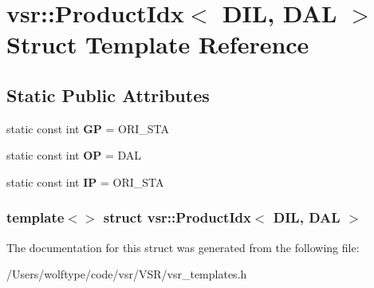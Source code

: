 \hypertarget{structvsr_1_1_product_idx_3_01_d_i_l_00_01_d_a_l_01_4}{\section{vsr\-:\-:Product\-Idx$<$ D\-I\-L, D\-A\-L $>$ Struct Template Reference}
\label{structvsr_1_1_product_idx_3_01_d_i_l_00_01_d_a_l_01_4}
}
\subsection*{Static Public Attributes}
\begin{DoxyCompactItemize}
\item 
\hypertarget{structvsr_1_1_product_idx_3_01_d_i_l_00_01_d_a_l_01_4_aad49c5754260022e11b15c71ac52991b}{static const int {\bfseries G\-P} = O\-R\-I\-\_\-\-S\-T\-A}\label{structvsr_1_1_product_idx_3_01_d_i_l_00_01_d_a_l_01_4_aad49c5754260022e11b15c71ac52991b}

\item 
\hypertarget{structvsr_1_1_product_idx_3_01_d_i_l_00_01_d_a_l_01_4_a127015b3a746f8e74b9de3f4977dae85}{static const int {\bfseries O\-P} = D\-A\-L}\label{structvsr_1_1_product_idx_3_01_d_i_l_00_01_d_a_l_01_4_a127015b3a746f8e74b9de3f4977dae85}

\item 
\hypertarget{structvsr_1_1_product_idx_3_01_d_i_l_00_01_d_a_l_01_4_a8050a35a1701db662cc97d1bb1add8c2}{static const int {\bfseries I\-P} = O\-R\-I\-\_\-\-S\-T\-A}\label{structvsr_1_1_product_idx_3_01_d_i_l_00_01_d_a_l_01_4_a8050a35a1701db662cc97d1bb1add8c2}

\end{DoxyCompactItemize}
\subsubsection*{template$<$$>$ struct vsr\-::\-Product\-Idx$<$ D\-I\-L, D\-A\-L $>$}



The documentation for this struct was generated from the following file\-:\begin{DoxyCompactItemize}
\item 
/\-Users/wolftype/code/vsr/\-V\-S\-R/vsr\-\_\-templates.\-h\end{DoxyCompactItemize}
